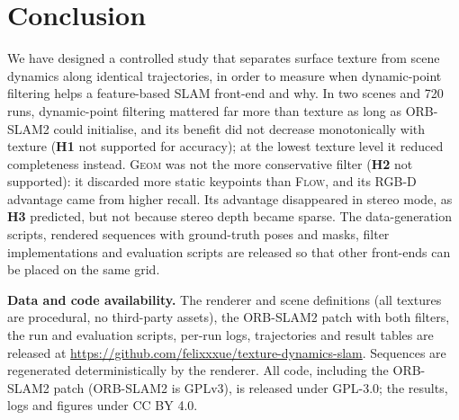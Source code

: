 \documentclass[conference]{IEEEtran}
\newcommand{\flow}{\textsc{Flow}}
\newcommand{\geom}{\textsc{Geom}}
\newcommand{\hyp}[1]{\textbf{H#1}}
\begin{document}
\section{Conclusion}
\label{sec:conclusion}

We have designed a controlled study that separates surface texture from scene dynamics along identical trajectories, in order to measure when dynamic-point filtering helps a feature-based SLAM front-end and why. In two scenes and 720 runs, dynamic-point filtering mattered far more than texture as long as ORB-SLAM2 could initialise, and its benefit did not decrease monotonically with texture (\hyp{1} not supported for accuracy); at the lowest texture level it reduced completeness instead. \geom{} was not the more conservative filter (\hyp{2} not supported): it discarded more static keypoints than \flow{}, and its RGB-D advantage came from higher recall. Its advantage disappeared in stereo mode, as \hyp{3} predicted, but not because stereo depth became sparse. The data-generation scripts, rendered sequences with ground-truth poses and masks, filter implementations and evaluation scripts are released so that other front-ends can be placed on the same grid.

\textbf{Data and code availability.} The renderer and scene definitions (all textures are procedural, no third-party assets), the ORB-SLAM2 patch with both filters, the run and evaluation scripts, per-run logs, trajectories and result tables are released at \url{https://github.com/felixxxue/texture-dynamics-slam}. Sequences are regenerated deterministically by the renderer. All code, including the ORB-SLAM2 patch (ORB-SLAM2 is GPLv3), is released under GPL-3.0; the results, logs and figures under CC BY 4.0.



\end{document}
